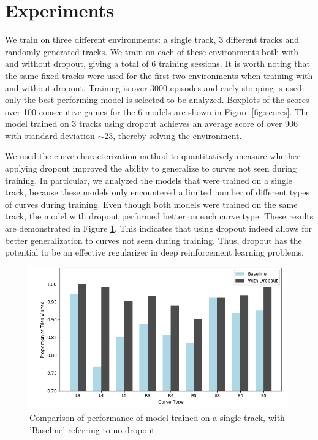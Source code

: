 \documentclass{article}
\begin{document}
\section{Experiments}

We train on three different environments: a single track, 3 different tracks and randomly generated tracks. We train on each of these environments both with and without dropout, giving a total of 6 training sessions. It is worth noting that the same fixed tracks were used for the first two environments when training with and without dropout. Training is over 3000 episodes and early stopping is used: only the best performing model is selected to be analyzed. Boxplots of the scores over 100 consecutive games for the 6 models are shown in Figure \ref{fig:scores}. The model trained on 3 tracks using dropout achieves an average score of over 906 with standard deviation $\sim$23, thereby solving the environment. 
\par

We used the curve characterization method to quantitatively measure whether applying dropout improved the ability to generalize to curves  not seen during training. In particular, we analyzed the models that were trained on a single track, because these models only encountered a limited number of different types of curves during training. Even though both models were trained on the same track, the model with dropout performed better on each curve type. These results are demonstrated in Figure \ref{fig:curves_comparison}. This indicates that using dropout indeed allows for better generalization to curves not seen during training. Thus, dropout has the potential to be an effective regularizer in deep reinforcement learning problems.

\begin{figure}[!h]
\centering
\includegraphics[width=\linewidth]{curves_comparison_notitle.png}
\caption{Comparison of performance of model trained on a single track, with 'Baseline' referring to no dropout. }
\label{fig:curves_comparison}
\end{figure}
\end{document}
